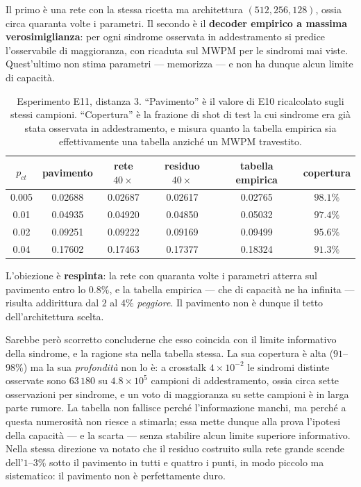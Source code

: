 Il primo è una rete con la stessa ricetta ma architettura $(512, 256, 128)$, ossia circa quaranta volte i parametri. Il secondo è il \textbf{decoder empirico a massima verosimiglianza}: per ogni sindrome osservata in addestramento si predice l'osservabile di maggioranza, con ricaduta sul \ac{MWPM} per le sindromi mai viste. Quest'ultimo non stima parametri --- memorizza --- e non ha dunque alcun limite di capacità.

\begin{table}[H]
\centering
\small
\begin{tabular}{c c ccc c}
\toprule
$p_{ct}$ & \textbf{pavimento} & \textbf{rete $40\times$} & \textbf{residuo $40\times$} & \textbf{tabella empirica} & \textbf{copertura} \\
\midrule
0.005 & 0.02688 & 0.02687 & 0.02617 & 0.02765 & $98.1\%$ \\
0.01  & 0.04935 & 0.04920 & 0.04850 & 0.05032 & $97.4\%$ \\
0.02  & 0.09251 & 0.09222 & 0.09169 & 0.09499 & $95.6\%$ \\
0.04  & 0.17602 & 0.17463 & 0.17377 & 0.18324 & $91.3\%$ \\
\bottomrule
\end{tabular}
\caption[Il pavimento alla prova di modelli più potenti]{Esperimento E11, distanza 3. ``Pavimento'' è il valore di E10 ricalcolato sugli stessi campioni. ``Copertura'' è la frazione di shot di test la cui sindrome era già stata osservata in addestramento, e misura quanto la tabella empirica sia effettivamente una tabella anziché un \ac{MWPM} travestito.}
\label{tab:neural_e11}
\end{table}

L'obiezione è \textbf{respinta}: la rete con quaranta volte i parametri atterra sul pavimento entro lo $0.8\%$, e la tabella empirica --- che di capacità ne ha infinita --- risulta addirittura dal $2$ al $4\%$ \emph{peggiore}. Il pavimento non è dunque il tetto dell'architettura scelta.

Sarebbe però scorretto concluderne che esso coincida con il limite informativo della sindrome, e la ragione sta nella tabella stessa. La sua copertura è alta ($91$--$98\%$) ma la sua \emph{profondità} non lo è: a crosstalk $4\times10^{-2}$ le sindromi distinte osservate sono $63\,180$ su $4.8\times10^5$ campioni di addestramento, ossia circa sette osservazioni per sindrome, e un voto di maggioranza su sette campioni è in larga parte rumore. La tabella non fallisce perché l'informazione manchi, ma perché a questa numerosità non riesce a stimarla; essa mette dunque alla prova l'ipotesi della capacità --- e la scarta --- senza stabilire alcun limite superiore informativo. Nella stessa direzione va notato che il residuo costruito sulla rete grande scende dell'$1$--$3\%$ sotto il pavimento in tutti e quattro i punti, in modo piccolo ma sistematico: il pavimento non è perfettamente duro.

